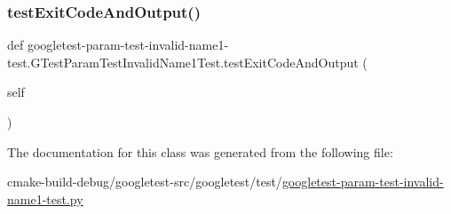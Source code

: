 \subsubsection{\texorpdfstring{testExitCodeAndOutput()}{testExitCodeAndOutput()}}
{\footnotesize\ttfamily def googletest-\/param-\/test-\/invalid-\/name1-\/test.\+G\+Test\+Param\+Test\+Invalid\+Name1\+Test.\+test\+Exit\+Code\+And\+Output (\begin{DoxyParamCaption}\item[{}]{self }\end{DoxyParamCaption})}



The documentation for this class was generated from the following file\+:\begin{DoxyCompactItemize}
\item 
cmake-\/build-\/debug/googletest-\/src/googletest/test/\mbox{\hyperlink{googletest-param-test-invalid-name1-test_8py}{googletest-\/param-\/test-\/invalid-\/name1-\/test.\+py}}\end{DoxyCompactItemize}
